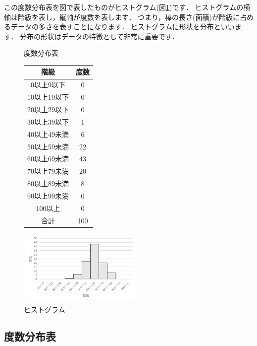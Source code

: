 この度数分布表を図で表したものがヒストグラム(図\ref{fig:histogram})です．
ヒストグラムの横軸は階級を表し，縦軸が度数を表します．
つまり，棒の長さ(面積)が階級に占めるデータの多さを表すことになります．
ヒストグラムに形状を分布といいます．
分布の形状はデータの特徴として非常に重要です．

\begin{figure}[tb]
    \begin{minipage}{0.5\hsize}
        \makeatletter
        \def\@captype{table}
        \makeatother
        \centering
        \caption{度数分布表}
        \begin{tabular}{c|c}
          階級          & 度数 \\ \hline
          0以上9以下   & 0 \\
          10以上19以下  & 0 \\
          20以上29以下  & 0 \\
          30以上39以下  & 1 \\
          40以上49未満  & 6 \\
          50以上59未満  & 22\\
          60以上69未満  & 43\\
          70以上79未満  & 20\\
          80以上89未満  & 8 \\
          90以上99未満  & 0 \\
          100以上       & 0 \\
          合計          & 100
        \end{tabular}
        \label{tab:hist}
    \end{minipage}
    \begin{minipage}{0.5\hsize}
        \centering
        \includegraphics[width=6cm]{chap1/hist.png}
        \caption{ヒストグラム}
        \label{fig:histogram}
    \end{minipage}
\end{figure}

\subsection{度数分布表}
\label{sec:freq}

